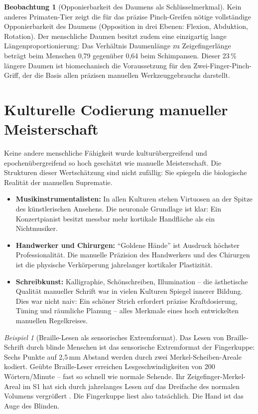﻿\documentclass[12pt,a4paper]{report}
\theoremstyle{plain}
\theoremstyle{definition}
\newtheorem{beobachtung}[theorem]{Beobachtung}
\theoremstyle{remark}
\newtheorem{beispiel}[theorem]{Beispiel}
\begin{document}
\begin{beobachtung}[Opponierbarkeit des Daumens als Schlüsselmerkmal]
Kein anderes Primaten-Tier zeigt die für das präzise Pinch-Greifen
nötige vollständige Opponierbarkeit des Daumens (Opposition in drei
Ebenen: Flexion, Abduktion, Rotation). Der menschliche Daumen besitzt
zudem eine einzigartig lange Längenproportionierung: Das Verhältnis
Daumenlänge zu Zeigefingerlänge beträgt beim Menschen 0{,}79 gegenüber
0{,}64 beim Schimpansen. Dieser 23\,\% längere Daumen ist biomechanisch
die Voraussetzung für den Zwei-Finger-Pinch-Griff, der die Basis allen
präzisen manuellen Werkzeuggebrauchs darstellt.
\end{beobachtung}

\section{Kulturelle Codierung manueller Meisterschaft}

Keine andere menschliche Fähigkeit wurde kulturübergreifend und epochenübergreifend
so hoch geschätzt wie manuelle Meisterschaft. Die Strukturen dieser Wertschätzung
sind nicht zufällig: Sie spiegeln die biologische Realität der manuellen
Suprematie.

\begin{itemize}
\item \textbf{Musikinstrumentalisten:} In allen Kulturen stehen Virtuosen
  an der Spitze des künstlerischen Ansehens. Die neuronale Grundlage ist
  klar: Ein Konzertpianist besitzt messbar mehr kortikale Handfläche als
  ein Nichtmusiker.
\item \textbf{Handwerker und Chirurgen:} ``Goldene Hände'' ist
  Ausdruck höchster Professionalität. Die manuelle Präzision des Handwerkers
  und des Chirurgen ist die physische Verkörperung jahrelanger kortikaler
  Plastizität.
\item \textbf{Schreibkunst:} Kalligraphie, Schönschreiben, Illumination --
  die ästhetische Qualität manueller Schrift war in vielen Kulturen
  Spiegel innerer Bildung. Dies war nicht naiv: Ein schöner Strich erfordert
  präzise Kraftdosierung, Timing und räumliche Planung -- alles Merkmale
  eines hoch entwickelten manuellen Regelkreises.
\end{itemize}

\begin{beispiel}[Braille-Lesen als sensorisches Extremformat]
Das Lesen von Braille-Schrift durch blinde Menschen ist das
sensorische Extremformat der Fingerkuppe: Sechs Punkte auf 2,5\,mm Abstand
werden durch zwei Merkel-Scheiben-Areale kodiert. Geübte Braille-Leser
erreichen Lesgeschwindigkeiten von 200 Wörtern/Minute -- fast so schnell
wie normale Sehende. Ihr Zeigefinger-Merkel-Areal im S1 hat sich durch
jahrelanges Lesen auf das Dreifache des normalen Volumens vergrößert
\cite{sterr1998}. Die Fingerkuppe liest also tatsächlich. Die Hand ist
das Auge des Blinden.
\end{beispiel}
\end{document}
